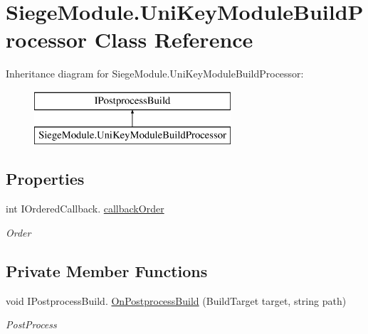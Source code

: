 \hypertarget{class_siege_module_1_1_uni_key_module_build_processor}{}\section{Siege\+Module.\+Uni\+Key\+Module\+Build\+Processor Class Reference}
\label{class_siege_module_1_1_uni_key_module_build_processor}
Inheritance diagram for Siege\+Module.\+Uni\+Key\+Module\+Build\+Processor\+:\begin{figure}[H]
\begin{center}
\leavevmode
\includegraphics[height=2.000000cm]{class_siege_module_1_1_uni_key_module_build_processor}
\end{center}
\end{figure}
\subsection*{Properties}
\begin{DoxyCompactItemize}
\item 
int I\+Ordered\+Callback. \mbox{\hyperlink{class_siege_module_1_1_uni_key_module_build_processor_ac8a224393b5e14a918f7b83c11e52d4d}{callback\+Order}}
\begin{DoxyCompactList}\small\item\em Order \end{DoxyCompactList}\end{DoxyCompactItemize}
\subsection*{Private Member Functions}
\begin{DoxyCompactItemize}
\item 
void I\+Postprocess\+Build. \mbox{\hyperlink{class_siege_module_1_1_uni_key_module_build_processor_a77a134492161b03b27b431bcfbf83011}{On\+Postprocess\+Build}} (Build\+Target target, string path)
\begin{DoxyCompactList}\small\item\em Post\+Process \end{DoxyCompactList}\end{DoxyCompactItemize}


